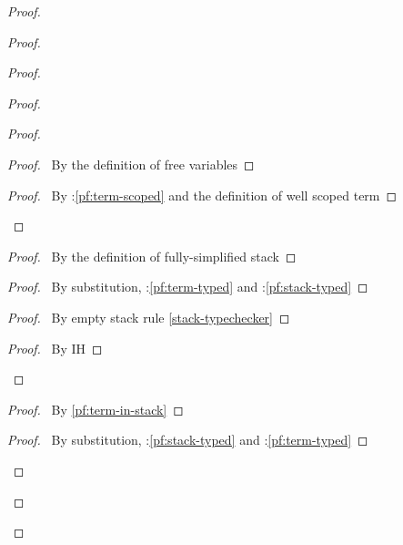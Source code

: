 \documentclass[a4paper]{article}
\begin{document}
\begin{proof}
\begin{proof}
\begin{proof}
\begin{proof}
        \begin{proof}
          \begin{proof}
            \pf\ By the definition of free variables
          \end{proof}
          \qedstep
          \begin{proof}
            \pf\ By \toplevel:\ref{pf:term-scoped} and the definition of well scoped term
          \end{proof}
        \end{proof}
        \begin{proof}
          \pf\ By the definition of fully-simplified stack
        \end{proof}
        \begin{proof}
          \pf\ By substitution, \toplevel:\ref{pf:term-typed} and \toplevel:\ref{pf:stack-typed}
        \end{proof}
        \begin{proof}
          \pf\ By empty stack rule \ref{stack-typechecker}
        \end{proof}
        \qedstep
        \begin{proof}
          \pf\ By IH
        \end{proof}
      \end{proof}
      \begin{proof}
        \pf\ By \ref{pf:term-in-stack}
      \end{proof}
      \begin{proof}
        \pf\ By substitution, \toplevel:\ref{pf:stack-typed} and \toplevel:\ref{pf:term-typed}
      \end{proof}

\end{proof}
\end{proof}
\end{proof}
\end{document}

